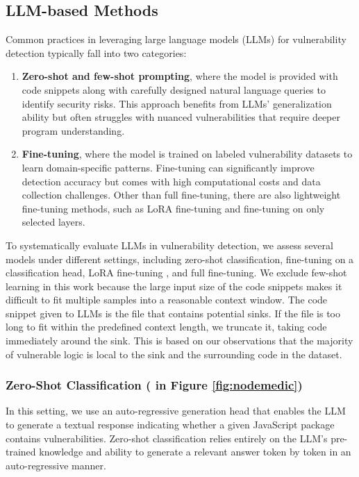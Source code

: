 \documentclass[12pt,openany,oneside,table]{cmuthesis}
\begin{document}
\subsection{LLM-based Methods}\label{subsec:llm_methods}
Common practices in leveraging large language models (LLMs) for vulnerability detection typically fall into two categories:
\begin{enumerate}
    \item \textbf{Zero-shot and few-shot prompting}, where the model is provided with code snippets along with carefully designed natural language queries to identify security risks. This approach benefits from LLMs' generalization ability but often struggles with nuanced vulnerabilities that require deeper program understanding.
    \item \textbf{Fine-tuning}, where the model is trained on labeled vulnerability datasets to learn domain-specific patterns. Fine-tuning can significantly improve detection accuracy but comes with high computational costs and data collection challenges. Other than full fine-tuning, there are also lightweight fine-tuning methods, such as LoRA fine-tuning \cite{lora, qlora} and fine-tuning on only selected layers.
\end{enumerate}

To systematically evaluate LLMs in vulnerability detection, we assess several models under different settings, including zero-shot classification, fine-tuning on a classification head, LoRA fine-tuning \cite{lora, qlora}, and full fine-tuning. We exclude few-shot learning in this work because the large input size of the code snippets makes it difficult to fit multiple samples into a reasonable context window.
The code snippet given to LLMs is the file that contains potential sinks. If the file is too long to fit within the predefined context length, we truncate it, taking code immediately around the sink. This is based on our observations that the majority of vulnerable logic is local to the sink and the surrounding code in the dataset. 

\subsubsection{Zero-Shot Classification \textup{( in Figure \ref{fig:nodemedic})}}
 
In this setting, we use an auto-regressive generation head that enables the LLM to generate a textual response indicating whether a given JavaScript package contains vulnerabilities. 
%
Zero-shot classification relies entirely on the LLM's pre-trained knowledge and ability to generate a relevant answer token by token in an auto-regressive manner.
\end{document}
